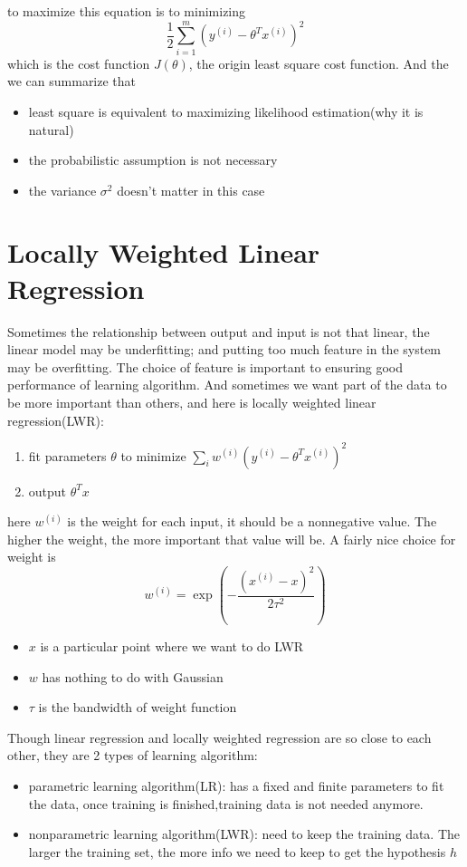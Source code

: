 \documentclass[10pt,a4paper,oneside]{article}
\begin{document}
to maximize this equation is to minimizing
\[
\frac{1}{2} \sum_{i=1}^{m} ( y^{(i)} - \theta^T x^{(i)})^2
\]
which is the cost function $J(\theta)$, the origin least square cost function. And the we can summarize that
\begin{itemize}
	\item least square is equivalent to maximizing likelihood estimation(why it is natural)
	\item the probabilistic assumption is not necessary
	\item the variance $\sigma^2$ doesn't matter in this case  
\end{itemize}

\section{Locally Weighted Linear Regression}
Sometimes the relationship between output and input is not that linear, the linear model may be underfitting; and putting too much feature in the system may be overfitting. The choice of feature is important to ensuring good performance of learning algorithm. And sometimes we want part of the data to be more important than others, and here is locally weighted linear regression(LWR):
\begin{enumerate}
	\item fit parameters $\theta$ to minimize $\sum_{i} w ^{(i)}(y^{(i)}-\theta^T x^{(i)})^2$
	\item output $\theta^T x$
\end{enumerate}
here $w^{(i)}$ is the weight for each input, it should be a nonnegative value. The higher the weight, the more important that value will be. A fairly nice choice for weight is
\[
w^{(i)} = \exp \left( -  \frac{(x^{(i)} - x)^2}{2 \tau^2}\right)
\] 
\begin{itemize}
	\item $x$ is a particular point where we want to do LWR
	\item $w$ has nothing to do with Gaussian
	\item $\tau$ is the bandwidth of weight function
\end{itemize}
Though linear regression and locally weighted regression are so close to each other, they are 2 types of learning algorithm:
\begin{itemize}
	\item parametric learning algorithm(LR): has a fixed and finite parameters to fit the data, once training is finished,training data is not needed anymore.
	\item nonparametric learning algorithm(LWR): need to keep the training data. The larger the training set, the more info we need to keep to get the hypothesis $h$
\end{itemize}
\end{document}
